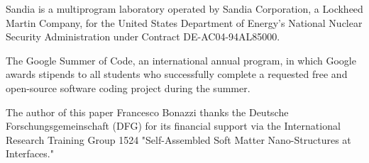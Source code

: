 Sandia is a multiprogram laboratory operated by Sandia Corporation, a Lockheed Martin Company, for the United States Department of Energy's National Nuclear Security Administration under Contract DE-AC04-94AL85000.

The Google Summer of Code, an international annual program, in which Google awards stipends to all students who successfully complete a requested free and open-source software coding project during the summer.

The author of this paper Francesco Bonazzi thanks the Deutsche
Forschungsgemeinschaft (DFG) for its financial support via the International
Research Training Group 1524 "Self-Assembled Soft Matter Nano-Structures at
Interfaces."

